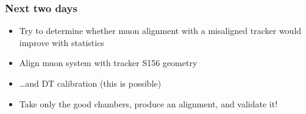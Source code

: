 \documentclass[compress]{beamer}
\begin{document}
\begin{frame}
\frametitle{Next two days}

\begin{itemize}\setlength{\itemsep}{0.5 cm}
\item Try to determine whether muon alignment with a misaligned tracker would improve with statistics
\item Align muon system with tracker S156 geometry
\item \ldots and DT calibration (this is possible)
\item Take only the good chambers, produce an alignment, and validate it!
\end{itemize}

\label{numpages}
\end{frame}
\end{document}
